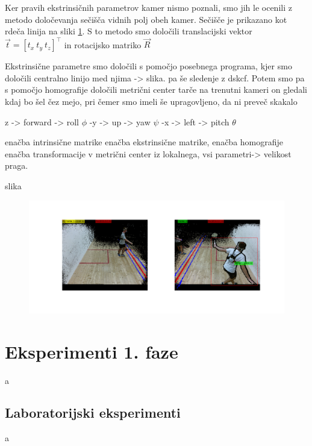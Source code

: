 Ker pravih ekstrinsičnih parametrov kamer nismo poznali, smo jih le ocenili z metodo določevanja sečišča vidnih polj obeh kamer. Sečišče je prikazano kot rdeča linija na sliki \ref{fig:zdruzevanje}. S to metodo smo določili translacijski vektor $\vec{t} = \left [ t_x~ t_y~ t_z \right]^\top$ in rotacijsko matriko $\vec{R}$ 

Ekstrinsične parametre smo določili s pomočjo posebnega programa, kjer smo določili centralno linijo med njima -> slika. pa še sledenje z dskcf. Potem smo pa s pomočjo homografije določili metrični center tarče na trenutni kameri on gledali kdaj bo šel čez mejo, pri čemer smo imeli še upragovljeno, da ni preveč skakalo 

z -> forward -> roll $\phi$
-y -> up -> yaw $\psi$
-x -> left -> pitch $\theta$



enačba intrinsične matrike enačba ekstrinsične matrike, enačba homografije enačba transformacije v metrični center iz lokalnega, vsi parametri-> velikost praga.

slika
\begin{figure}[htb]
\centering
\includegraphics[width=\columnwidth]{./Slike/zdruzevanje-example.png}
\caption{}
\label{fig:zdruzevanje}
\end{figure}











\section{Eksperimenti 1. faze}
a

\subsection{Laboratorijski eksperimenti}
a

